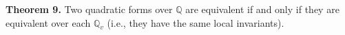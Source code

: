 \textbf{Theorem 9.} Two quadratic forms over $\mathbb{Q}$ are equivalent if and only if they are equivalent over each $\mathbb{Q}_v$ (i.e., they have the same local invariants).
